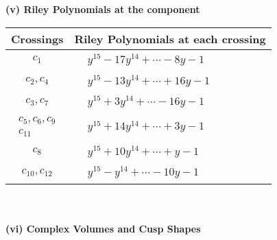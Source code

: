 \documentclass[1p]{elsarticle_modified}
\theoremstyle{definition}
\begin{document}
\newpage\renewcommand{\arraystretch}{1}
\flushleft \textbf{(v) Riley Polynomials at the component}\newline \\
\begin{tabular}{m{50pt}|m{274pt}}
Crossings & \hspace{64pt}Riley Polynomials at each crossing \\
\hline $$\begin{aligned}c_{1}\end{aligned}$$&$\begin{aligned}
&y^{15}-17 y^{14}+\cdots-8 y-1
\end{aligned}$\\
\hline $$\begin{aligned}c_{2},c_{4}\end{aligned}$$&$\begin{aligned}
&y^{15}-13 y^{14}+\cdots+16 y-1
\end{aligned}$\\
\hline $$\begin{aligned}c_{3},c_{7}\end{aligned}$$&$\begin{aligned}
&y^{15}+3 y^{14}+\cdots-16 y-1
\end{aligned}$\\
\hline $$\begin{aligned}c_{5},c_{6},c_{9}\\c_{11}\end{aligned}$$&$\begin{aligned}
&y^{15}+14 y^{14}+\cdots+3 y-1
\end{aligned}$\\
\hline $$\begin{aligned}c_{8}\end{aligned}$$&$\begin{aligned}
&y^{15}+10 y^{14}+\cdots+y-1
\end{aligned}$\\
\hline $$\begin{aligned}c_{10},c_{12}\end{aligned}$$&$\begin{aligned}
&y^{15}- y^{14}+\cdots-10 y-1
\end{aligned}$\\
\hline
\end{tabular}\\~\\
\newpage\flushleft \textbf{(vi) Complex Volumes and Cusp Shapes}
\end{document}
